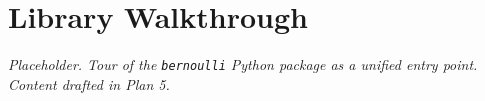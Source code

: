 \chapter{Library Walkthrough}
\label{app:library}

\textit{Placeholder. Tour of the \texttt{bernoulli} Python package as a
unified entry point. Content drafted in Plan 5.}

